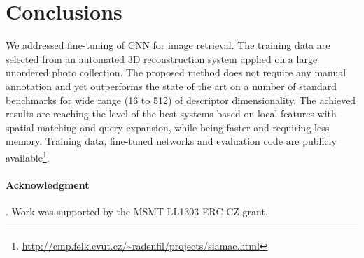 \documentclass[runningheads]{llncs}
\begin{document}






\vspace{-2pt}
\section{Conclusions}
%
We addressed fine-tuning of CNN for image retrieval. The training data are selected from an automated 3D reconstruction system applied on a large unordered photo collection. The proposed method does not require any manual annotation and yet outperforms the state of the art on a number of standard benchmarks for wide range (16 to 512) of descriptor dimensionality. The achieved results are reaching the level of the best systems based on local features with spatial matching and query expansion, while being faster and requiring less memory. Training data, fine-tuned networks and evaluation code are publicly available\footnote{\href{http://cmp.felk.cvut.cz/~radenfil/projects/siamac.html}{http://cmp.felk.cvut.cz/\~{}radenf{}i{}l/projects/siamac.html}}.

\clearpage

\paragraph{Acknowledgment}. Work was supported by the MSMT LL1303 ERC-CZ grant.



\end{document}
